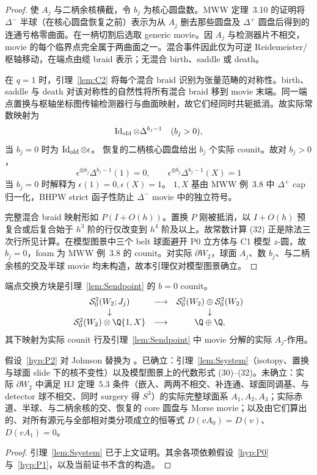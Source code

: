 \begin{proof}
使 \(A_j\) 与二柄余核横截，令 \(b_j\) 为核心圆盘数。MWW 定理~3.10 的证明将 \(\Delta^-\) 半球（在核心圆盘恢复之前）表示为从 \(A_j\) 删去那些圆盘及 \(\Delta^+\) 圆盘后得到的连通亏格零曲面。在一柄切割后选取 generic movie。因 \(A_j\) 与检测器片不相交，movie 的每个临界点完全属于两曲面之一。混合事件因此仅为可逆 Reidemeister/枢轴移动，在端点由缆 braid 表示；无混合 birth、saddle 或 death。

在 \(q=1\) 时，引理~\ref{lem:C2} 将每个混合 braid 识别为张量范畴的对称性。birth、saddle 与 death 对该对称性的自然性将所有混合 braid 移到 movie 末端。同一端点置换与枢轴坐标图传输检测器行与曲面映射，故它们经同时共轭抵消。故实际常数映射为
\[
\operatorname{Id}_{\rm old}\otimes\Delta^{b_j-1}\quad(b_j>0),
\]
当 \(b_j=0\) 时为 \(\operatorname{Id}_{\rm old}\otimes\epsilon\)。
恢复的二柄核心圆盘给出 \(b_j\) 个实际 counit。故对 \(b_j>0\)，
\[
\epsilon^{\otimes b_j}\Delta^{b_j-1}(1)=0,\qquad
\epsilon^{\otimes b_j}\Delta^{b_j-1}(X)=1
\tag{32}
\]
当 \(b_j=0\) 时解释为 \(\epsilon(1)=0,\epsilon(X)=1\)。
\(1,X\) 基由 MWW 例~3.8 中 \(\Delta^+\) cap 归一化，BHPW strict 函子性防止 \(\Delta^-\) movie 中的独立符号。

完整混合 braid 映射形如 \(P(I+O(h))\)。置换 \(P\) 刚被抵消，以 \(I+O(h)\) 预复合或后复合始于 \(h^3\) 阶的行仅改变到 \(h^4\) 阶及以上。故常数计算 (32) 正是除法三次行所见计算。在模型图景中三个 belt 球面避开 P0 立方体与 C1 模型 $z$-圆，故 $b_j=0$，foam 为 MWW 例~3.8 的 counit。对实际 $\partial W_2$，球面 $A_j$、数 $b_j$、与二柄余核的交及半球 movie 均未构造，故本引理仅对模型图景确立。
\end{proof}

端点交换方块是引理~\ref{lem:Sendpoint} 的 $b=0$ counit。
\[
\begin{array}{ccc}
\mathcal S^2_0(W_2;J_j)&\longrightarrow&
\mathcal S^2_0(W_2)\oplus\mathcal S^2_0(W_2)\\
\downarrow&&\downarrow\\
\mathcal S^2_0(W_2)\otimes\Q\{1,X\}&\longrightarrow&\Q\oplus\Q,
\end{array}
\]
其下映射为实际 counit 行及引理~\ref{lem:Sendpoint} 中 movie 分解的实际 \(A_j\)-作用。

\begin{proposition}[S 的状态]\label{thm:Sdischarge}
假设~\ref{hyp:P2} 对 Johnson 替换为 \Open。已确立：引理~\ref{lem:Ssystem}（isotopy、置换与球面 slide 下的核不变性）以及模型图景上的代数形式 (30)--(32)。未确立：实际 $\partial W_2$ 中满足 HJ 定理~5.3 条件（嵌入、两两不相交、补连通、球面同调基、与 detector 球不相交、同时 surgery 得 $S^3$）的实际完整球面系 $A_1,A_2,A_3$；实际赤道、半球、与二柄余核的交、恢复的 core 圆盘与 Morse movie；以及由它们算出的、对所有源元与全部相对类分项成立的恒等式 $D(vA_0)=D(v)$、$D(vA_1)=0$。
\end{proposition}

\begin{proof}
引理~\ref{lem:Ssystem} 已于上文证明。其余各项依赖假设~\ref{hyp:P0} 与~\ref{hyp:P1}，以及当前证书不含的构造。
\end{proof}
